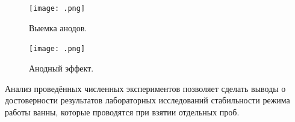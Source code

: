 \documentclass{article}
\begin{document}
\begin{figure}[h!]
    \centering
    \texttt{[image: .png]}
    \caption{Выемка анодов.}
    \label{fig:} 
\end{figure}

\begin{figure}[h!]
    \centering
    \texttt{[image: .png]}
    \caption{Анодный эффект.}
    \label{fig:} 
\end{figure}

Анализ проведённых численных экспериментов позволяет сделать выводы о достоверности результатов лабораторных исследований стабильности режима работы ванны, которые проводятся при взятии отдельных проб.

\begin{thebibliography}{}
\end{thebibliography}
\end{document}
